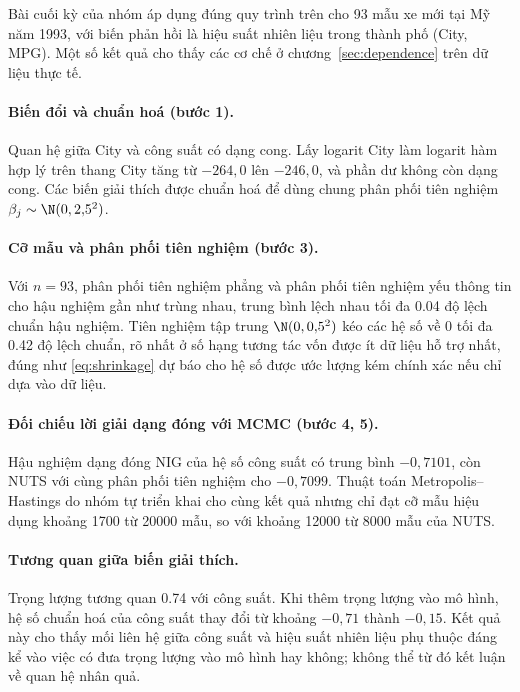 \documentclass[12pt,a4paper]{report}
\begin{document}
Bài cuối kỳ của nhóm áp dụng đúng quy trình trên cho 93 mẫu xe mới tại Mỹ năm
1993, với biến phản hồi là hiệu suất nhiên liệu trong thành phố (City, MPG). Một
số kết quả cho thấy các cơ chế ở chương~\ref{sec:dependence} trên dữ liệu thực tế.

\paragraph{Biến đổi và chuẩn hoá (bước 1).} Quan hệ giữa City và công suất có
dạng cong. Lấy logarit City làm logarit hàm hợp lý trên thang City tăng từ $-264{,}0$
lên $-246{,}0$, và phần dư không còn dạng cong. Các biến giải thích được chuẩn hoá
để dùng chung phân phối tiên nghiệm $\beta_j \sim \N(0, 2{,}5^2)$.

\paragraph{Cỡ mẫu và phân phối tiên nghiệm (bước 3).} Với $n = 93$, phân phối tiên nghiệm phẳng và phân phối tiên nghiệm yếu
thông tin cho hậu nghiệm gần như trùng nhau, trung bình lệch nhau tối đa
\num{0.04} độ lệch chuẩn hậu nghiệm. Tiên nghiệm tập trung $\N(0, 0{,}5^2)$ kéo các hệ số về
0 tối đa \num{0.42} độ lệch chuẩn, rõ nhất ở số hạng tương tác vốn được ít dữ
liệu hỗ trợ nhất, đúng như \eqref{eq:shrinkage} dự báo cho hệ số được ước lượng kém chính xác nếu chỉ dựa vào dữ liệu.

\paragraph{Đối chiếu lời giải dạng đóng với MCMC (bước 4, 5).} Hậu nghiệm dạng đóng NIG của hệ
số công suất có trung bình $-0{,}7101$, còn NUTS với cùng phân phối tiên nghiệm cho $-0{,}7099$.
Thuật toán Metropolis--Hastings do nhóm tự triển khai cho cùng kết quả nhưng chỉ đạt cỡ mẫu hiệu dụng
khoảng \num{1700} từ \num{20000} mẫu, so với khoảng \num{12000} từ \num{8000}
mẫu của NUTS.

\paragraph{Tương quan giữa biến giải thích.} Trọng lượng tương quan \num{0.74}
với công suất. Khi thêm trọng lượng vào mô hình, hệ số chuẩn hoá của công suất
thay đổi từ khoảng $-0{,}71$ thành $-0{,}15$. Kết quả này cho thấy mối liên hệ
giữa công suất và hiệu suất nhiên liệu phụ thuộc đáng kể vào việc có đưa trọng
lượng vào mô hình hay không; không thể từ đó kết luận về quan hệ nhân quả.
\end{document}

